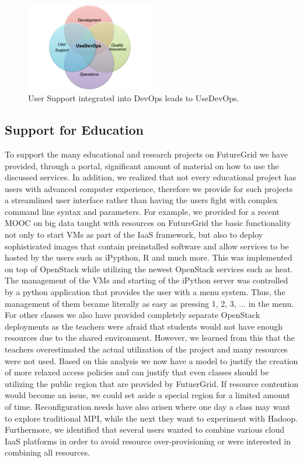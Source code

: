 \documentclass[graybox]{svmult}
\begin{document}
\begin{figure}[htb]
  \centering
    \includegraphics[width=0.5\textwidth]{images/usedevops.pdf}
  \caption{User Support integrated into DevOps leads to UseDevOps.}
  \label{F:usedevops}
\end{figure}




\subsection{Support for Education}


To support the many educational and research projects on FutureGrid we have provided, through a portal, significant amount of material on how to use the discussed services. In addition, we realized that not every educational project has users with advanced computer experience, therefore we provide for such projects a streamlined user interface rather than having the users fight with complex command line syntax and parameters. For example, we provided for a recent MOOC on big data taught with resources on FutureGrid the basic functionality not only to start VMs as part of the IaaS framework, but also to deploy sophisticated images that contain preinstalled software and allow services to be hosted by the users such as iPypthon, R and much more. This was implemented on top of OpenStack while utilizing the newest OpenStack services such as heat. The management of the VMs and starting of the iPython server was controlled by a python application that provides the user with a menu system. Thus, the management of them became literally as easy as pressing 1, 2, 3, ... in the menu. For other classes we also have provided completely separate OpenStack deployments as the teachers were afraid that students would not have enough resources due to the shared environment. However, we learned from this that the teachers overestimated the actual utilization of the project and many resources were not used. Based on this analysis we now have a model to justify the creation of more relaxed access policies and can justify that even classes should be utilizing the public region that are provided by FutuerGrid. If resource contention would become an issue, we could set aside a special region for a limited amount of time. Reconfiguration needs have also arisen where one day a class may want to explore traditional MPI, while the next they want to experiment with Hadoop. Furthermore, we identified that several users wanted to combine various cloud IaaS platforms in order to avoid resource over-provisioning or were interested in combining all resources. 
\end{document}
